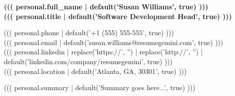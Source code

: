 \documentclass[11pt,a4paper]{article}
\begin{document}
\noindent
\begin{minipage}[t]{\textwidth}
\vspace{15mm}
\hspace{15mm}
\begin{minipage}[t]{0.9\textwidth}

\begin{minipage}[t]{0.6\textwidth}
{\fontsize{28}{32}\selectfont\bfseries ((( personal.full_name | default('Susan Williams', true) )))}\\[5pt]
{\fontsize{11}{13}\selectfont\color{teal-pri}\bfseries ((( personal.title | default('Software Development Head', true) )))}
\end{minipage}
\hfill
\begin{minipage}[t]{0.35\textwidth}
\raggedleft
\color{body!80}
{\fontsize{9}{11}\selectfont ((( personal.phone | default('+1 (555) 555-555', true) ))) \space \color{teal-pri}\faPhone}\\[4pt]
{\fontsize{9}{11}\selectfont ((( personal.email | default('susan.williams@resumegemini.com', true) ))) \space \color{teal-pri}\faEnvelope}\\[4pt]
{\fontsize{9}{11}\selectfont ((( personal.linkedin | replace('https://', '') | replace('http://', '') | default('linkedin.com/company/resumegemini', true) ))) \space \color{teal-pri}\faLinkedin}\\[4pt]
{\fontsize{9}{11}\selectfont ((( personal.location | default('Atlanta, GA, 30301', true) ))) \space \color{teal-pri}\faMapMarker*}
\end{minipage}

\vspace{15pt}


\vspace{8mm}
\noindent
\hspace{-15mm}
\begin{minipage}[t]{\paperwidth}
\hspace{15mm}
\begin{minipage}[t]{0.85\textwidth}
\color{white}
{\fontsize{9.5}{15}\selectfont ((( personal.summary | default('Summary goes here...', true) )))}
\end{minipage}
\end{minipage}


\end{minipage}
\end{minipage}
\end{document}
